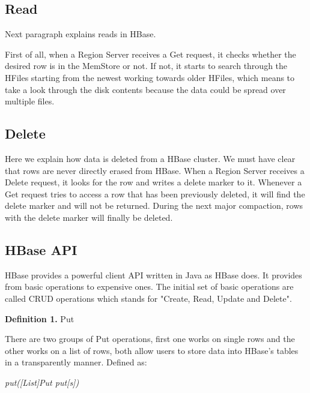 \subsection{Read}
Next paragraph explains reads in HBase.
\par
First of all, when a Region Server receives a Get request, it checks whether the desired row is in the MemStore or not. If not, it starts to search through the HFiles starting from the newest working towards older HFiles, which means to take a look through the disk contents because the data could be spread over multiple files.

\subsection{Delete}
Here we explain how data is deleted from a HBase cluster. We must have clear that rows are never directly erased from HBase. When a Region Server receives a Delete request, it looks for the row and writes a delete marker to it. Whenever a Get request tries to access a row that has been previously deleted, it will find the delete marker and will not be returned. During the next major compaction, rows with the delete marker will finally be deleted.

\subsection {HBase API}

HBase provides a powerful client API written in Java as HBase does. It provides from basic operations to expensive ones. The initial set of basic operations are called CRUD operations which stands for "Create, Read, Update and Delete".

\bigskip


\textbf{Definition 1. }Put 

There are two groups of Put operations, first one works on single rows and the other works on a list of rows, both allow users to store data into HBase's tables in a transparently manner. Defined as:
\par
\bigskip
\centerline{\textit{put([List]Put put[s])}}
\bigskip

